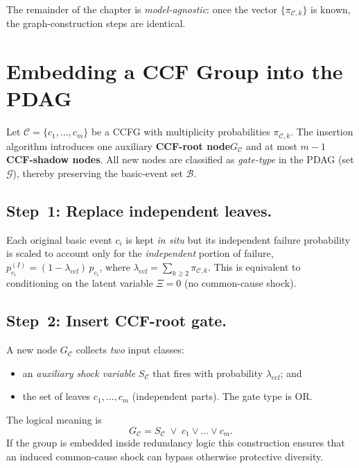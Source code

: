 The remainder of the chapter is \emph{model-agnostic}: once the vector
\(\{\pi_{\mathcal{C},k}\}\) is known, the graph-construction steps are
identical.

\section{Embedding a CCF Group into the PDAG}
\label{subsec:ccf_insertion}

Let \(\mathcal{C}=\{c_1,\dots,c_m\}\) be a CCFG with multiplicity
probabilities \(\pi_{\mathcal{C},k}\).  The insertion algorithm introduces one
auxiliary \textbf{CCF-root node}\;\(G_{\!\mathcal{C}}\) and at most
\(m-1\) \textbf{CCF-shadow nodes}.  All new nodes are classified as
\emph{gate-type} in the PDAG (set \(\mathcal{G}\)), thereby preserving the
basic-event set \(\mathcal{B}\).

\subsection{Step~1: Replace independent leaves.}  Each original basic event
\(c_i\) is kept \emph{in situ} but its independent failure probability is
scaled to account only for the \emph{independent} portion of failure,
\(p^{(\!I\!)}_{c_i}= (1-\lambda_{\text{ccf}})\,p_{c_i}\), where
\(\lambda_{\text{ccf}}=\sum_{k\ge 2} \pi_{\mathcal{C},k}\).  This is equivalent
to conditioning on the latent variable \(\Xi=0\) (no common-cause shock).

\subsection{Step~2: Insert CCF-root gate.}  A new node \(G_{\!\mathcal{C}}\)
collects \emph{two} input classes:
\begin{itemize}
  \item an \textit{auxiliary shock variable} \(S_{\mathcal{C}}\) that fires with
        probability \(\lambda_{\text{ccf}}\); and
  \item the set of leaves \(c_1,\dots,c_m\) (independent parts).  The gate type
        is OR.
\end{itemize}
The logical meaning is
\[G_{\!\mathcal{C}} = S_{\mathcal{C}} \;\lor\; c_1 \lor \dots \lor c_m.
\]
If the group is embedded inside redundancy logic this construction ensures that
an induced common-cause shock can bypass otherwise protective diversity.


